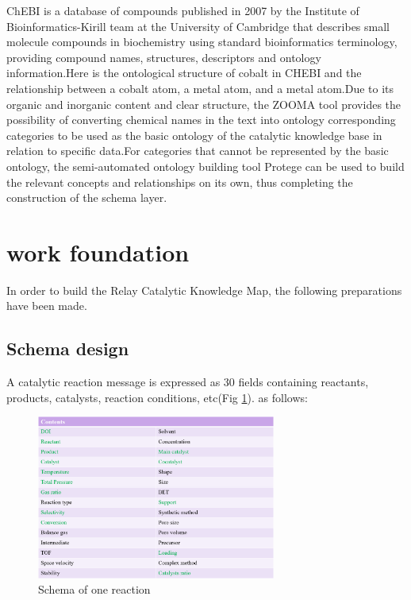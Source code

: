 \documentclass[%
 aip,
 jmp,%
 amsmath,amssymb,
 reprint,%
]{revtex4-2}
\begin{document}
ChEBI is a database of compounds published in 2007 by the Institute of Bioinformatics-Kirill team at the University of Cambridge that 
describes small molecule compounds in biochemistry using standard bioinformatics terminology, providing compound names, structures, 
descriptors and ontology information.Here is the ontological structure of cobalt in CHEBI and the relationship between a cobalt atom, 
a metal atom, and a metal atom.Due to its organic and inorganic content and clear structure, the ZOOMA tool provides the possibility 
of converting chemical names in the text into ontology corresponding categories to be used as the basic ontology of the catalytic 
knowledge base in relation to specific data.For categories that cannot be represented by the basic ontology, the semi-automated ontology 
building tool Protege can be used to build the relevant concepts and relationships on its own, thus completing the construction of the 
schema layer.

\section{work foundation}
In order to build the Relay Catalytic Knowledge Map, the following preparations have been made.

\subsection{Schema design}
A catalytic reaction message is expressed as 30 fields containing reactants, products, catalysts, reaction conditions, etc(Fig \ref{ Fig.5 }). as follows:
\begin{figure}[htbp]
 \centering
 \includegraphics[width=0.7\textwidth]{figure/5.png}
 \caption{ Schema of one reaction }
 \label{ Fig.5 }
\end{figure}
\end{document}
